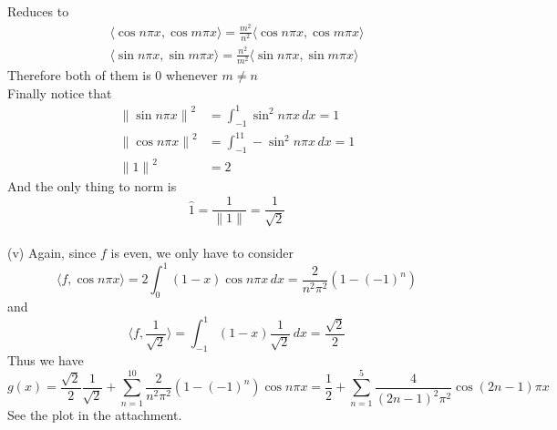 \documentclass[12pt]{article}
\def\dotp#1#2{\langle#1,#2\rangle}
\begin{document}
Reduces to
\begin{align*}
\dotp{\cos{n\pi x}}{\cos{m\pi x}}=\frac{m^2}{n^2}\dotp{\cos{n\pi x}}{\cos{m\pi x}}\\
\dotp{\sin{n\pi x}}{\sin{m\pi x}}=\frac{n^2}{m^2}\dotp{\sin{n\pi x}}{\sin{m\pi x}}
\end{align*}
Therefore both of them is $0$ whenever $m\neq n$\\
Finally notice that 
\begin{align*}
{\|\sin{n\pi x}\|}^2&=\int_{-1}^1\sin^2{n\pi x}\,dx=1\\
{\|\cos{n\pi x}\|}^2&=\int_{-1}^11-\sin^2{n\pi x}\,dx=1\\
{\|1\|}^2&=2
\end{align*}
And the only thing to norm is 
\[
\hat{1}=\frac{1}{{\|1\|}}=\frac{1}{\sqrt2}
\]\\[0.5 em]
(v) Again, since $f$ is even, we only have to consider
\[
\dotp{f}{\cos n\pi x}=2\int_{0}^1(1-x)\cos{n\pi x}\,dx=\frac{2}{n^2{\pi}^2}(1-{(-1)}^n)
\]
and
\[
\dotp{f}{\frac{1}{\sqrt2}}=\int_{-1}^1(1-x)\frac{1}{\sqrt2}\,dx=\frac{\sqrt2}{2}
\]
Thus we have
\[
g(x)=\frac{\sqrt2}{2}\frac{1}{\sqrt{2}}+\sum_{n=1}^{10}\frac{2}{n^2{\pi}^2}(1-{(-1)}^n)\cos {n\pi x}=\frac{1}{2}+\sum_{n=1}^{5}\frac{4}{{(2n-1)}^2{\pi}^2}\cos {(2n-1)\pi x}
\]
See the plot in the attachment.
\end{document}
